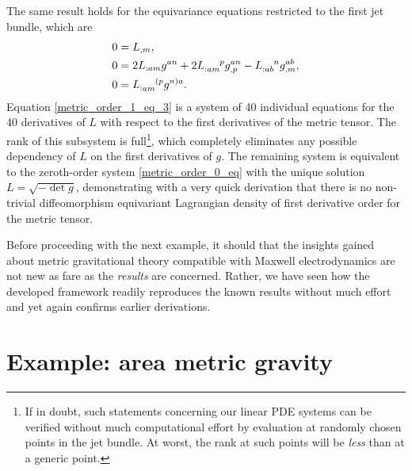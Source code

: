 The same result holds for the equivariance equations restricted to the first jet bundle, which are
\begin{subequations}
  \begin{align}
    0 &{} = L_{,m}, \label{metric_order_1_eq_1}\\
    0 &{} = 2 L_{:am}g^{an} + 2 L_{:am}^{\hphantom{:am}p}g^{an}_{,p} - L_{:ab}^{\hphantom{:ab}n}g^{ab}_{,m}, \label{metric_order_1_eq_2}\\
    0 &{} = L_{:am}^{\hphantom{:am}(p}g^{n)a}. \label{metric_order_1_eq_3}
  \end{align}
\end{subequations}
Equation \ref{metric_order_1_eq_3} is a system of 40 individual equations for the 40 derivatives of $L$ with respect to the first derivatives of the metric tensor. The rank of this subsystem is full\footnote{If in doubt, such statements concerning our linear PDE systems can be verified without much computational effort by evaluation at randomly chosen points in the jet bundle. At worst, the rank at such points will be \emph{less} than at a generic point.}, which completely eliminates any possible dependency of $L$ on the first derivatives of $g$. The remaining system is equivalent to the zeroth-order system \eqref{metric_order_0_eq} with the unique solution $L=\sqrt{-\operatorname{det}g}$, demonstrating with a very quick derivation that there is no non-trivial diffeomorphism equivariant Lagrangian density of first derivative order for the metric tensor.

Before proceeding with the next example, it should that the insights gained about metric gravitational theory compatible with Maxwell electrodynamics are not new as fare as the \emph{results} are concerned. Rather, we have seen how the developed framework readily reproduces the known results without much effort and yet again confirms earlier derivations.

\section{Example: area metric gravity}
\label{section_gled}

